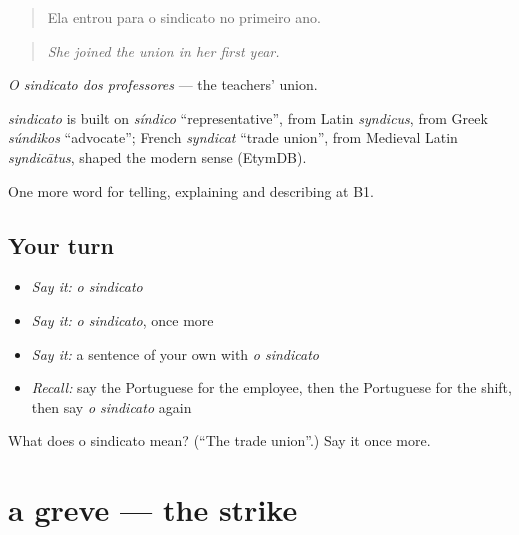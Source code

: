 \begin{quote}
Ela entrou para o sindicato no primeiro ano.
\end{quote}

\begin{quote}
\emph{She joined the union in her first year.}
\end{quote}

\emph{O sindicato dos professores} — the teachers' union.

\begin{cousinweb}
\emph{sindicato} is built on \emph{síndico} \textquotedblleft{}representative\textquotedblright{}, from Latin \emph{syndicus}, from Greek \emph{súndikos} \textquotedblleft{}advocate\textquotedblright{}; French \emph{syndicat} \textquotedblleft{}trade union\textquotedblright{}, from Medieval Latin \emph{syndicātus}, shaped the modern sense (EtymDB).
\end{cousinweb}

\begin{grammarlens}[title={What you've built}]
One more word for telling, explaining and describing at B1.
\end{grammarlens}

\subsection*{Your turn}
\begin{itemize}
\raggedright
  \item \emph{Say it:} \emph{o sindicato}
  \item \emph{Say it:} \emph{o sindicato}, once more
  \item \emph{Say it:} a sentence of your own with \emph{o sindicato}
  \item \emph{Recall:} say the Portuguese for the employee, then the Portuguese for the shift, then say \emph{o sindicato} again
\end{itemize}

\begin{tcolorbox}[breakable,colback=teal!4,colframe=teal!35!black,title={Before you move on}]
What does o sindicato mean? (\textquotedblleft{}The trade union\textquotedblright{}.) Say it once more.
\end{tcolorbox}
\section[a greve]{a greve — the strike}

\label{lesson:PT-C358-greve}



